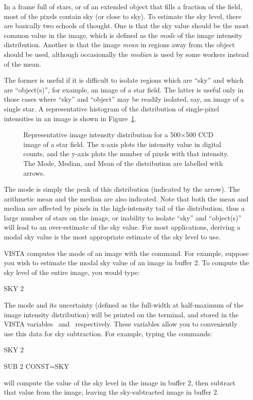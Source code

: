 In a frame full of stars, or of an extended object that fills a fraction of
the field, most of the pixels contain sky (or close to sky).  To estimate the
sky level, there are basically two schools of thought.  One is that the sky
value should be the most common value in the image, which is defined as the
{\it mode} of the image intensity distribution.  Another is that the image
{\it mean} in regions away from the object should be used, although
occasionally the {\it median} is used by some workers instead of the mean.  

The former is useful if it is difficult to isolate regions which are ``sky''
and which are ``object(s)'', for example, an image of a star field.  The
latter is useful only in those cases where ``sky'' and ``object'' may be
readily isolated, say, an image of a single star.  A representative histogram
of the distribution of single-pixel intensities in an image is shown in
Figure~\ref{fig:skyhist}. 
\begin{figure}[t]
   \vspace{4.0in} 
   \caption[Representative Image Intensity Distribution]
           {\small\rm \label{fig:skyhist}
            Representative image intensity distribution for a 500$\times$500
            CCD image of a star field.  The x-axis plots the intensity
            value in digital counts, and the y-axis plots the number of
            pixels with that intensity.  The Mode, Median, and Mean of the
            distribution are labelled with arrows.}
\end{figure}
The mode is simply the peak of this distribution (indicated by the arrow). 
The arithmetic mean and the median are also indicated.  Note that both the
mean and median are affected by pixels in the high-intensity tail of the
distribution, thus a large number of stars on the image, or inability to
isolate ``sky'' and ``object(s)'' will lead to an over-estimate of the sky
value.  For most applications, deriving a modal sky value is the most
appropriate estimate of the sky level to use. 

VISTA computes the mode of an image with the  command.  For example,
suppose you wish to estimate the modal sky value of an image in buffer 2.  To
compute the sky level of the entire image, you would type: 
\begin{command}
      \item SKY 2
\end{command}
The mode and its uncertainty (defined as the full-width at half-maximum of the
image intensity distribution) will be printed on the terminal, and stored in
the VISTA variables \ and \ respectively. These
variables allow you to conveniently use this data for sky subtraction.  For
example, typing the commands: 
\begin{command}
      \item SKY 2
      \item SUB 2 CONST=SKY
\end{command}
will compute the value of the sky level in the image in buffer 2, then
subtract that value from the image, leaving the sky-subtracted image in buffer
2. 

